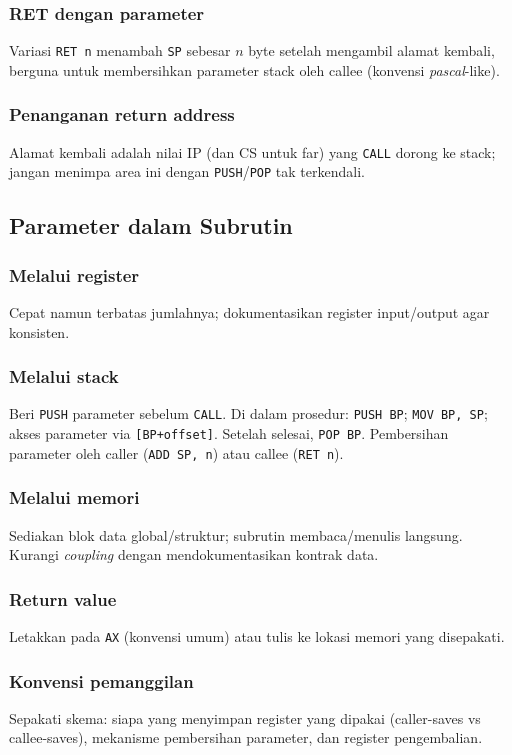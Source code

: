 \subsubsection{RET dengan parameter}
Variasi \texttt{RET n} menambah \texttt{SP} sebesar \(n\) byte setelah mengambil alamat kembali, berguna untuk membersihkan parameter stack oleh callee (konvensi \textit{pascal}-like).

\subsubsection{Penanganan return address}
Alamat kembali adalah nilai IP (dan CS untuk far) yang \texttt{CALL} dorong ke stack; jangan menimpa area ini dengan \texttt{PUSH}/\texttt{POP} tak terkendali.

\subsection{Parameter dalam Subrutin}
\subsubsection{Melalui register}
Cepat namun terbatas jumlahnya; dokumentasikan register input/output agar konsisten.

\subsubsection{Melalui stack}
Beri \texttt{PUSH} parameter sebelum \texttt{CALL}. Di dalam prosedur: \texttt{PUSH BP}; \texttt{MOV BP, SP}; akses parameter via \texttt{[BP+offset]}. Setelah selesai, \texttt{POP BP}. Pembersihan parameter oleh caller (\texttt{ADD SP, n}) atau callee (\texttt{RET n}).

\subsubsection{Melalui memori}
Sediakan blok data global/struktur; subrutin membaca/menulis langsung. Kurangi \textit{coupling} dengan mendokumentasikan kontrak data.

\subsubsection{Return value}
Letakkan pada \texttt{AX} (konvensi umum) atau tulis ke lokasi memori yang disepakati.

\subsubsection{Konvensi pemanggilan}
Sepakati skema: siapa yang menyimpan register yang dipakai (caller-saves vs callee-saves), mekanisme pembersihan parameter, dan register pengembalian.

